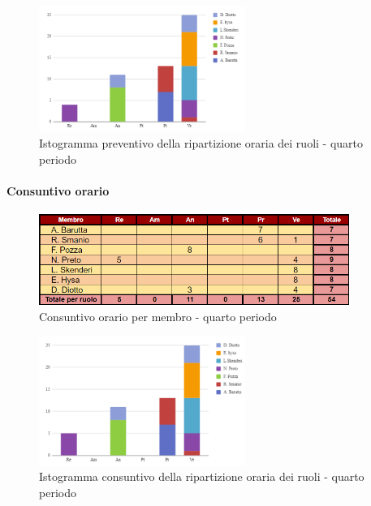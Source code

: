 \vspace{0.6cm}

\begin{figure}[H]
    \centering
    \includegraphics[width=0.6\textwidth]{../Images/preventivoDivisioneRuoli4Periodo.png}
    \caption{Istogramma preventivo della ripartizione oraria dei ruoli - quarto periodo}
    \label{fig:Preventivo_ripartizione_oraria_4}
\end{figure}

\paragraph{Consuntivo orario} 

\begin{figure}[H]
    \centering
    \includegraphics[width=0.9\textwidth]{../Images/consuntivoOrario4Periodo.png}
    \caption{Consuntivo orario per membro - quarto periodo}
    \label{fig:Constuntivo_orario_4}
\end{figure}

\vspace{0.4cm}

\begin{figure}[H]
    \centering
    \includegraphics[width=0.6\textwidth]{../Images/consuntivoDivisioneRuoli4Periodo.png}
    \caption{Istogramma consuntivo della ripartizione oraria dei ruoli - quarto periodo}
    \label{fig:Consuntivo_ripartizione_oraria_4}
\end{figure}

